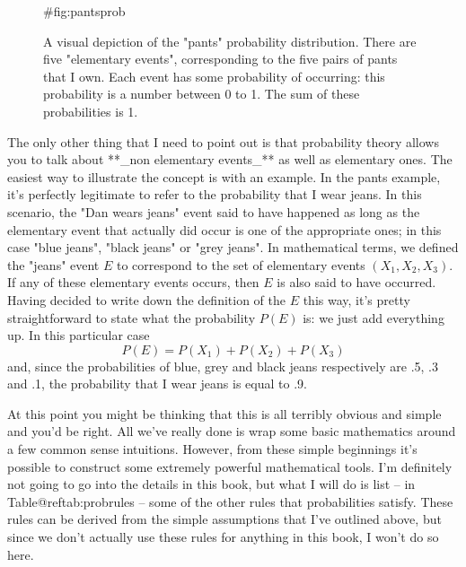 \begin{figure}
\begin{center}
\caption{A visual depiction of the "pants" probability distribution. There are five "elementary events", corresponding to the five pairs of pants that I own. Each event has some probability of occurring: this probability is a number between 0 to 1. The sum of these probabilities is 1.}
{#fig:pantsprob}
\HR
\end{center}
\end{figure}



The only other thing that I need to point out is that probability theory allows you to talk about **_non elementary events_** as well as elementary ones. The easiest way to illustrate the concept is with an example. In the pants example, it's perfectly legitimate to refer to the probability that I wear jeans. In this scenario, the "Dan wears jeans" event said to have happened as long as the elementary event that actually did occur is one of the appropriate ones; in this case "blue jeans", "black jeans" or "grey jeans". In mathematical terms, we defined the "jeans" event $E$ to correspond to the set of elementary events $(X_1, X_2, X_3)$. If any of these elementary events occurs, then $E$ is also said to have occurred. Having decided to write down the definition of the $E$ this way, it's pretty straightforward to state what the probability $P(E)$ is: we just add everything up. In this particular case
$$
P(E) = P(X_1) + P(X_2) + P(X_3)
$$ 
and, since the probabilities of blue, grey and black jeans respectively are .5, .3 and .1, the probability that I wear jeans is equal to .9. 

At this point you might be thinking that this is all terribly obvious and simple and you'd be right. All we've really done is wrap some basic mathematics around a few common sense intuitions. However, from these simple beginnings it's possible to construct some extremely powerful mathematical tools. I'm definitely not going to go into the details in this book, but what I will do is list -- in  Table@reftab:probrules -- some of the other rules that probabilities satisfy. These rules can be derived from the simple assumptions that I've outlined above, but since we don't actually use these rules for anything in this book, I won't do so here.

